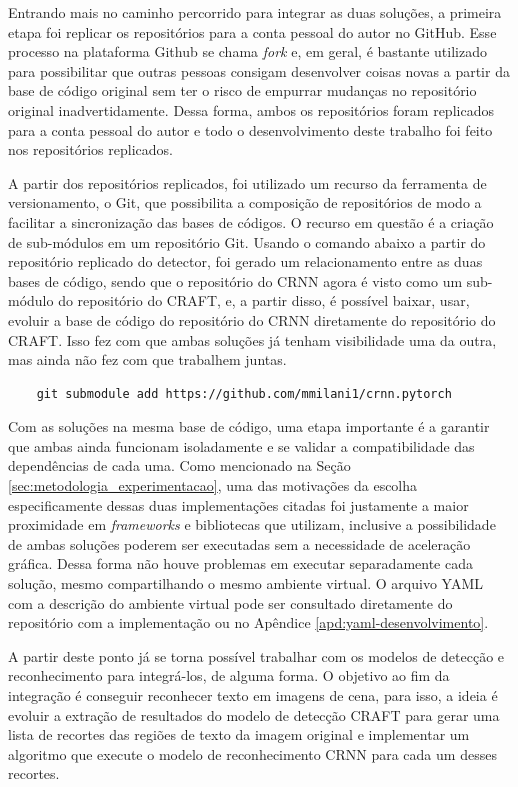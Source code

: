 Entrando mais no caminho percorrido para integrar as duas soluções, a primeira etapa foi replicar os repositórios para a conta pessoal do autor no GitHub. 
Esse processo na plataforma Github se chama \textit{fork} e, em geral, é bastante utilizado para possibilitar que outras pessoas consigam desenvolver coisas 
novas a partir da base de código original sem ter o risco de empurrar mudanças no repositório original inadvertidamente. Dessa forma, ambos os repositórios 
foram replicados para a conta pessoal do autor e todo o desenvolvimento deste trabalho foi feito nos repositórios replicados.

A partir dos repositórios replicados, foi utilizado um recurso da ferramenta de versionamento, o Git, que possibilita a composição de repositórios de modo 
a facilitar a sincronização das bases de códigos. O recurso em questão é a criação de sub-módulos em um repositório Git. Usando o comando abaixo a partir 
do repositório replicado do detector, foi gerado um relacionamento entre as duas bases de código, sendo que o repositório do CRNN agora é visto como um 
sub-módulo do repositório do CRAFT, e, a partir disso, é possível baixar, usar, evoluir a base de código do repositório do CRNN diretamente do repositório 
do CRAFT. Isso fez com que ambas soluções já tenham visibilidade uma da outra, mas ainda não fez com que trabalhem juntas.

\begin{verbatim}
    git submodule add https://github.com/mmilani1/crnn.pytorch
\end{verbatim}

Com as soluções na mesma base de código, uma etapa importante é a garantir que ambas ainda funcionam isoladamente e se validar a compatibilidade das dependências 
de cada uma. Como mencionado na Seção \ref{sec:metodologia_experimentacao}, uma das motivações da escolha especificamente dessas duas implementações citadas foi 
justamente a maior proximidade em \textit{frameworks} e bibliotecas que utilizam, inclusive a possibilidade de ambas soluções poderem ser executadas sem a 
necessidade de aceleração gráfica. Dessa forma não houve problemas em executar separadamente cada solução, mesmo compartilhando o mesmo ambiente virtual. 
O arquivo YAML com a descrição do ambiente virtual pode ser consultado diretamente do repositório com a implementação ou no Apêndice \ref{apd:yaml-desenvolvimento}.

A partir deste ponto já se torna possível trabalhar com os modelos de detecção e reconhecimento para integrá-los, de alguma forma. O objetivo ao fim da integração 
é conseguir reconhecer texto em imagens de cena, para isso, a ideia é evoluir a extração de resultados do modelo de detecção CRAFT para gerar uma lista de 
recortes das regiões de texto da imagem original e implementar um algoritmo que execute o modelo de reconhecimento CRNN para cada um desses recortes.

